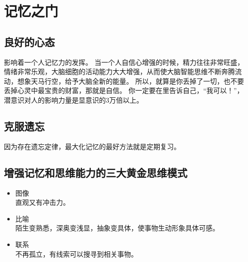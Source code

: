 
\chapter{记忆之门}



\section{良好的心态}

影响着一个人记忆力的发挥。
当一个人自信心增强的时候，精力往往非常旺盛， 情绪非常乐观，大脑细胞的活动能力大大增强，从而使大脑智能思维不断奔腾流动，想象天马行空，给予大脑全新的能量。
所以，就算是你丢掉了一切，也不要丢掉心灵中最宝贵的财富，那就是自信。
你一定要在里告诉自己，“我可以！”，潜意识对人的影响力量是显意识的3万倍以上。




\section{克服遗忘}

因为存在遗忘定律，最大化记忆的最好方法就是定期复习。


\section{增强记忆和思维能力的三大黄金思维模式}

\begin{itemize}
\item 图像\\
  直观又有冲击力。
\item 比喻\\
  陌生变熟悉，深奥变浅显，抽象变具体，使事物生动形象具体可感。
\item 联系\\
  不再孤立，有线索可以搜寻到相关事物。
\end{itemize}




